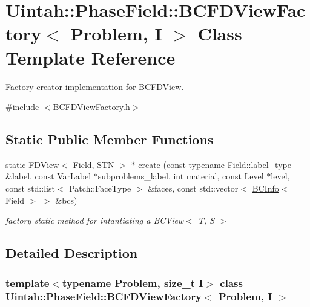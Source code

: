 \hypertarget{classUintah_1_1PhaseField_1_1BCFDViewFactory}{}\section{Uintah\+:\+:Phase\+Field\+:\+:B\+C\+F\+D\+View\+Factory$<$ Problem, I $>$ Class Template Reference}
\label{classUintah_1_1PhaseField_1_1BCFDViewFactory}


\hyperlink{classUintah_1_1PhaseField_1_1Factory}{Factory} creator implementation for \hyperlink{classUintah_1_1PhaseField_1_1BCFDView}{B\+C\+F\+D\+View}.  




{\ttfamily \#include $<$B\+C\+F\+D\+View\+Factory.\+h$>$}

\subsection*{Static Public Member Functions}
\begin{DoxyCompactItemize}
\item 
static \hyperlink{namespaceUintah_1_1PhaseField_a63032464b1cd54eaa53c1c29109746ac}{F\+D\+View}$<$ Field, S\+TN $>$ $\ast$ \hyperlink{classUintah_1_1PhaseField_1_1BCFDViewFactory_ae064d3d5c16b89c2afe44205cedc4ff8}{create} (const typename Field\+::label\+\_\+type \&label, const Var\+Label $\ast$subproblems\+\_\+label, int material, const Level $\ast$level, const std\+::list$<$ Patch\+::\+Face\+Type $>$ \&faces, const std\+::vector$<$ \hyperlink{structUintah_1_1PhaseField_1_1BCInfo}{B\+C\+Info}$<$ Field $>$ $>$ \&bcs)
\begin{DoxyCompactList}\small\item\em factory static method for intantiating a B\+C\+View$<$ T, S $>$ \end{DoxyCompactList}\end{DoxyCompactItemize}


\subsection{Detailed Description}
\subsubsection*{template$<$typename Problem, size\+\_\+t I$>$\newline
class Uintah\+::\+Phase\+Field\+::\+B\+C\+F\+D\+View\+Factory$<$ Problem, I $>$}

